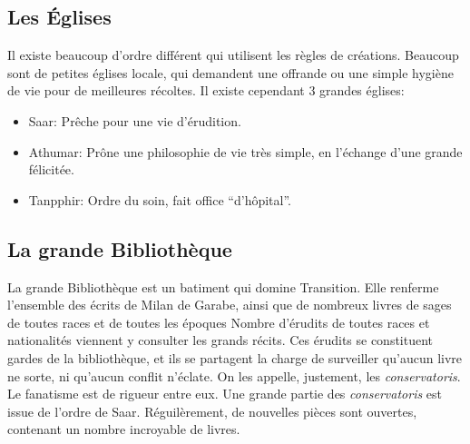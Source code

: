 \subsection{Les Églises}
Il existe beaucoup d'ordre différent qui utilisent les règles de créations. Beaucoup sont de petites églises locale, qui demandent une offrande ou une simple hygiène de vie pour de meilleures récoltes.
Il existe cependant 3 grandes églises:
\begin{itemize}
\item Saar: Prêche pour une vie d'érudition.
\item Athumar: Prône une philosophie de vie très simple, en l'échange d'une grande félicitée.
\item Tanpphir: Ordre du soin, fait office “d'hôpital”.
\end{itemize} 
\subsection{La grande Bibliothèque}
\hypertarget{bibliotheque}{}
La grande Bibliothèque est un batiment qui domine Transition. Elle renferme l'ensemble des écrits de Milan de Garabe, ainsi que de nombreux livres de sages de toutes races et de toutes les époques
Nombre d'érudits de toutes races et nationalités viennent y consulter les grands récits.
\newline
Ces érudits se constituent gardes de la bibliothèque, et ils se partagent la charge de surveiller qu'aucun livre ne sorte, ni qu'aucun conflit n'éclate. On les appelle, justement, les \textit{conservatoris}. Le fanatisme est de rigueur entre eux. Une grande partie des \textit{conservatoris} est issue de l'ordre de Saar. 
\newline
Réguilèrement, de nouvelles pièces sont ouvertes, contenant un nombre incroyable de livres.